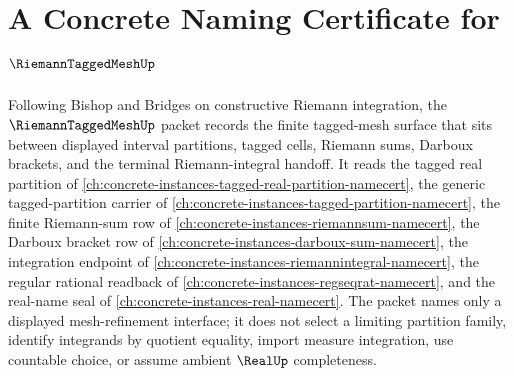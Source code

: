 \chapter{A Concrete Naming Certificate for $\RiemannTaggedMeshUp$}
\label{ch:concrete-instances-riemann-tagged-mesh-namecert}

Following Bishop and Bridges on constructive Riemann integration, the $\RiemannTaggedMeshUp$ packet records the finite tagged-mesh surface that sits between displayed interval partitions, tagged cells, Riemann sums, Darboux brackets, and the terminal Riemann-integral handoff. It reads the tagged real partition of \autoref{ch:concrete-instances-tagged-real-partition-namecert}, the generic tagged-partition carrier of \autoref{ch:concrete-instances-tagged-partition-namecert}, the finite Riemann-sum row of \autoref{ch:concrete-instances-riemannsum-namecert}, the Darboux bracket row of \autoref{ch:concrete-instances-darboux-sum-namecert}, the integration endpoint of \autoref{ch:concrete-instances-riemannintegral-namecert}, the regular rational readback of \autoref{ch:concrete-instances-regseqrat-namecert}, and the real-name seal of \autoref{ch:concrete-instances-real-namecert}. The packet names only a displayed mesh-refinement interface; it does not select a limiting partition family, identify integrands by quotient equality, import measure integration, use countable choice, or assume ambient $\RealUp$ completeness.

